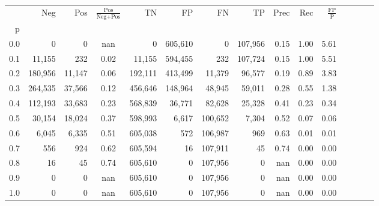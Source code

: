 \begin{tabular}{rrrcrrrrrrrrrrr}
\toprule
{} &      Neg &     Pos & $\frac{\text{Pos}}{\text{Neg}+\text{Pos}}$ &       TN &       FP &       FN &       TP &  Prec &   Rec & $\frac{\text{FP}}{\text{P}}$ \\
p   &          &         &                                            &          &          &          &          &       &       &                              \\
\midrule
0.0 &        0 &       0 &                                        nan &        0 &  605,610 &        0 &  107,956 &  0.15 &  1.00 &                         5.61 \\
0.1 &   11,155 &     232 &                                       0.02 &   11,155 &  594,455 &      232 &  107,724 &  0.15 &  1.00 &                         5.51 \\
0.2 &  180,956 &  11,147 &                                       0.06 &  192,111 &  413,499 &   11,379 &   96,577 &  0.19 &  0.89 &                         3.83 \\
0.3 &  264,535 &  37,566 &                                       0.12 &  456,646 &  148,964 &   48,945 &   59,011 &  0.28 &  0.55 &                         1.38 \\
0.4 &  112,193 &  33,683 &                                       0.23 &  568,839 &   36,771 &   82,628 &   25,328 &  0.41 &  0.23 &                         0.34 \\
0.5 &   30,154 &  18,024 &                                       0.37 &  598,993 &    6,617 &  100,652 &    7,304 &  0.52 &  0.07 &                         0.06 \\
0.6 &    6,045 &   6,335 &                                       0.51 &  605,038 &      572 &  106,987 &      969 &  0.63 &  0.01 &                         0.01 \\
0.7 &      556 &     924 &                                       0.62 &  605,594 &       16 &  107,911 &       45 &  0.74 &  0.00 &                         0.00 \\
0.8 &       16 &      45 &                                       0.74 &  605,610 &        0 &  107,956 &        0 &   nan &  0.00 &                         0.00 \\
0.9 &        0 &       0 &                                        nan &  605,610 &        0 &  107,956 &        0 &   nan &  0.00 &                         0.00 \\
1.0 &        0 &       0 &                                        nan &  605,610 &        0 &  107,956 &        0 &   nan &  0.00 &                         0.00 \\
\bottomrule
\end{tabular}
